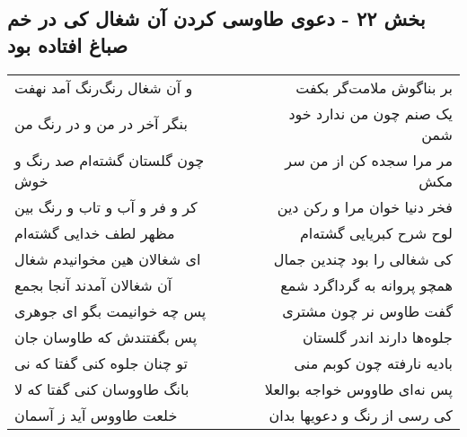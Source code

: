 \begin{center}
\section*{بخش ۲۲ - دعوی طاوسی کردن آن شغال کی در  خم صباغ افتاده بود}
\label{sec:sh022}
\begin{longtable}{l p{0.5cm} r}
و آن شغال رنگ‌رنگ آمد نهفت
&&
بر بناگوش ملامت‌گر بکفت
\\
بنگر آخر در من و در رنگ من
&&
یک صنم چون من ندارد خود شمن
\\
چون گلستان گشته‌ام صد رنگ و خوش
&&
مر مرا سجده کن از من سر مکش
\\
کر و فر و آب و تاب و رنگ بین
&&
فخر دنیا خوان مرا و رکن دین
\\
مظهر لطف خدایی گشته‌ام
&&
لوح شرح کبریایی گشته‌ام
\\
ای شغالان هین مخوانیدم شغال
&&
کی شغالی را بود چندین جمال
\\
آن شغالان آمدند آنجا بجمع
&&
همچو پروانه به گرداگرد شمع
\\
پس چه خوانیمت بگو ای جوهری
&&
گفت طاوس نر چون مشتری
\\
پس بگفتندش که طاوسان جان
&&
جلوه‌ها دارند اندر گلستان
\\
تو چنان جلوه کنی گفتا که نی
&&
بادیه نارفته چون کوبم منی
\\
بانگ طاووسان کنی گفتا که لا
&&
پس نه‌ای طاووس خواجه بوالعلا
\\
خلعت طاووس آید ز آسمان
&&
کی رسی از رنگ و دعویها بدان
\\
\end{longtable}
\end{center}
